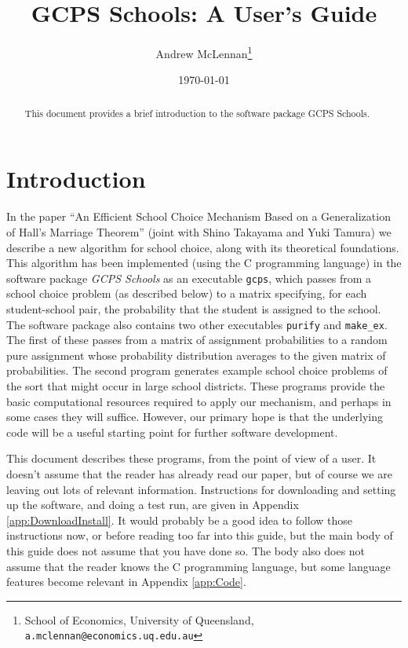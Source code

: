 \documentclass[12pt]{article}
\theoremstyle{definition}
\begin{document}
\title{GCPS Schools: A User's Guide}

\author{Andrew McLennan\footnote{School of Economics, University of
    Queensland, {\tt a.mclennan@economics.uq.edu.au}}}

\date{\today}

\maketitle

\begin{abstract}
This document provides a brief introduction to the software package GCPS Schools.
\end{abstract}


\section{Introduction}

In the paper ``An Efficient School Choice Mechanism Based on a
Generalization of Hall's Marriage Theorem'' (joint with Shino Takayama
and Yuki Tamura) we describe a new algorithm for school choice, along
with its theoretical foundations.  This algorithm has been implemented
(using the C programming language) in the software package \emph{GCPS
  Schools} as an executable \texttt{gcps}, which passes from a school
choice problem (as described below) to a matrix specifying, for each
student-school pair, the probability that the student is assigned to
the school.  The software package also contains two other executables
\texttt{purify} and \texttt{make\_ex}.  The first of these passes from
a matrix of assignment probabilities to a random pure assignment whose
probability distribution averages to the given matrix of
probabilities.  The second program generates example school choice
problems of the sort that might occur in large school districts.
These programs provide the basic computational resources required to
apply our mechanism, and perhaps in some cases they will suffice.
However, our primary hope is that the underlying code will be a useful
starting point for further software development.

This document describes these programs, from the point of view of a
user.  It doesn't assume that the reader has already read our paper,
but of course we are leaving out lots of relevant information.
Instructions for downloading and setting up the software, and doing a
test run, are given in Appendix \ref{app:DownloadInstall}.  It would
probably be a good idea to follow those instructions now, or before
reading too far into this guide, but the main body of this guide does
not assume that you have done so.  The body also does not assume that
the reader knows the C programming language, but some language
features become relevant in Appendix \ref{app:Code}.
\end{document}
